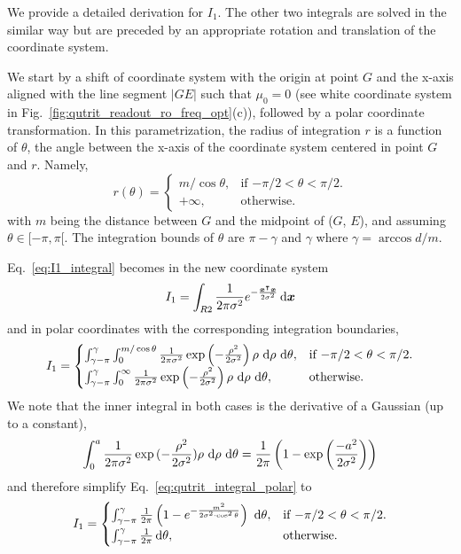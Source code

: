 We provide a detailed derivation for $I_1$. The other two integrals are solved in the similar way but are preceded by an appropriate rotation and translation of the coordinate system. 

We start by a shift of coordinate system with the origin at point $G$ and the x-axis aligned with the line segment $|GE|$ such that $\mu_0 = 0$ (see white coordinate system in Fig.~\ref{fig:qutrit_readout_ro_freq_opt}(c)), followed by a polar coordinate transformation. In this parametrization, the radius of integration $r$ is a function of $\theta$, the angle between the x-axis of the coordinate system centered in point $G$ and $r$. Namely,
\begin{equation}
r(\theta) =\begin{cases}
    m / \cos \theta, & \text{if $-\pi/2<\theta<\pi/2$}.\\
    +\infty, & \text{otherwise}.
  \end{cases} 
\end{equation} 
with $m$ being the distance between $G$ and the midpoint of ($G$, $E$), and assuming $\theta \in [-\pi, \pi[$. The integration bounds of $\theta$ are $ \pi - \gamma$ and $\gamma$ where $\gamma = \arccos{d/m}$.

Eq.~\eqref{eq:I1_integral} becomes in the new coordinate system
\begin{equation}
I_1 = \int_{R2} \frac{1}{2\pi \sigma^2} e^{-\frac{\bm{x}^\intercal \bm{x}}{2 \sigma^2}} \,\mathrm d\bm{x}
\end{equation}
and in polar coordinates with the corresponding integration boundaries, 
\begin{equation}\label{eq:qutrit_integral_polar}
I_1=\begin{cases}
    \int_{\gamma - \pi}^{\gamma}\int_0^{m/\cos \theta}{\frac{1}{2\pi \sigma^2} \exp{\left(-\frac{\rho^2}{2 \sigma^2}\right)}\, \rho \,\,\mathrm d\rho \,\,\mathrm d\theta}, & \text{if $-\pi/2<\theta<\pi/2$}.\\
    \int_{\gamma - \pi}^{\gamma}\int_0^{\infty}{\frac{1}{2\pi \sigma^2} \exp{\left(-\frac{\rho^2}{2 \sigma^2}\right)}\,\rho \,\,\mathrm d\rho \,\,\mathrm d\theta}, & \text{otherwise}.
  \end{cases}
\end{equation}
We note that the inner integral in both cases is the derivative of a Gaussian (up to a constant),
\begin{equation}
\int_0^{a}{\frac{1}{2\pi \sigma^2} \exp{(-\frac{\rho^2}{2 \sigma^2})}\rho \,\,\mathrm d\rho \,\,\mathrm d\theta} =\frac{1}{2\pi} \left(1 - \exp{\left(\frac{-a^2}{2\sigma^2}\right)}\right)
\end{equation}
and therefore simplify Eq.~\eqref{eq:qutrit_integral_polar} to
\begin{equation}
I_1 =
\begin{cases}
    \int_{\gamma - \pi}^{\gamma}{\frac{1}{2\pi} \left(1 - e^{-\frac{m^2}{2 \sigma^2 \cdot \cos^2{\theta}}}\right)\,\,\mathrm d\theta}, & \text{if $-\pi/2<\theta<\pi/2$}.\\
    \int_{\gamma - \pi}^{\gamma}{\frac{1}{2\pi}\,\mathrm d\theta}, & \text{otherwise}.
  \end{cases}
\end{equation}

